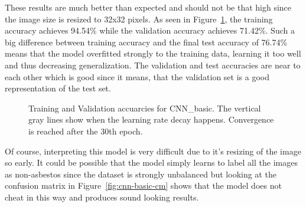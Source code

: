 These results are much better than expected and should not be that high since the image size is resized to 32x32 pixels. As seen in Figure~\ref{fig:cnn-basic}, the training accuracy achieves 94.54\% while the validation accuracy achieves 71.42\%. Such a big difference between training accuracy and the final test accuracy of 76.74\% means that the model overfitted strongly to the training data, learning it too well and thus decreasing generalization. The validation and test accuracies are near to each other which is good since it means, that the validation set is a good representation of the test set.\\


\begin{figure}[h]
\centering
\caption{Training and Validation accuarcies for CNN\_basic. The vertical gray lines show when the learning rate decay happens. Convergence is reached after the 30th epoch.}
\label{fig:cnn-basic}
\end{figure}

\quad

Of course, interpreting this model is very difficult due to it's resizing of the image so early. It could be possible that the model simply learns to label all the images as non-asbestos since the dataset is strongly unbalanced but looking at the confusion matrix in Figure~\ref{fig:cnn-basic-cm} shows that the model does not cheat in this way and produces sound looking results. \\


